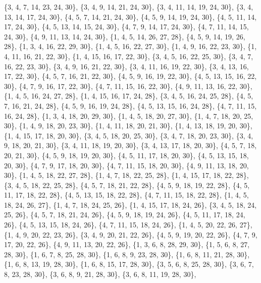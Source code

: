 \documentclass[11pt,a4paper]{article}
\begin{document}
{\{3, 4, 7, 14, 23, 24, 30\}, \{3, 4, 9, 14, 21, 24, 30\}, \{3, 4, 11, 14, 19, 24, 30\}, \{3, 4, 13, 14, 17, 24, 30\}, \{4, 5, 7, 14, 21, 24, 30\},
\{4, 5, 9, 14, 19, 24, 30\}, \{4, 5, 11, 14, 17, 24, 30\}, \{4, 5, 13, 14, 15, 24, 30\}, \{4, 7, 9, 14, 17, 24, 30\}, \{4, 7, 11, 14, 15, 24, 30\},
\{4, 9, 11, 13, 14, 24, 30\}, \{1, 4, 5, 14, 26, 27, 28\}, \{4, 5, 9, 14, 19, 26, 28\}, \{1, 3, 4, 16, 22, 29, 30\}, \{1, 4, 5, 16, 22, 27, 30\},
\{1, 4, 9, 16, 22, 23, 30\}, \{1, 4, 11, 16, 21, 22, 30\}, \{1, 4, 15, 16, 17, 22, 30\}, \{3, 4, 5, 16, 22, 25, 30\}, \{3, 4, 7, 16, 22, 23, 30\},
\{3, 4, 9, 16, 21, 22, 30\}, \{3, 4, 11, 16, 19, 22, 30\}, \{3, 4, 13, 16, 17, 22, 30\}, \{4, 5, 7, 16, 21, 22, 30\}, \{4, 5, 9, 16, 19, 22, 30\},
\{4, 5, 13, 15, 16, 22, 30\}, \{4, 7, 9, 16, 17, 22, 30\}, \{4, 7, 11, 15, 16, 22, 30\}, \{4, 9, 11, 13, 16, 22, 30\}, \{1, 4, 5, 16, 24, 27, 28\},
\{1, 4, 15, 16, 17, 24, 28\}, \{3, 4, 5, 16, 24, 25, 28\}, \{4, 5, 7, 16, 21, 24, 28\}, \{4, 5, 9, 16, 19, 24, 28\}, \{4, 5, 13, 15, 16, 24, 28\},
\{4, 7, 11, 15, 16, 24, 28\}, \{1, 3, 4, 18, 20, 29, 30\}, \{1, 4, 5, 18, 20, 27, 30\}, \{1, 4, 7, 18, 20, 25, 30\}, \{1, 4, 9, 18, 20, 23, 30\},
\{1, 4, 11, 18, 20, 21, 30\}, \{1, 4, 13, 18, 19, 20, 30\}, \{1, 4, 15, 17, 18, 20, 30\}, \{3, 4, 5, 18, 20, 25, 30\}, \{3, 4, 7, 18, 20, 23, 30\},
\{3, 4, 9, 18, 20, 21, 30\}, \{3, 4, 11, 18, 19, 20, 30\}, \{3, 4, 13, 17, 18, 20, 30\}, \{4, 5, 7, 18, 20, 21, 30\}, \{4, 5, 9, 18, 19, 20, 30\},
\{4, 5, 11, 17, 18, 20, 30\}, \{4, 5, 13, 15, 18, 20, 30\}, \{4, 7, 9, 17, 18, 20, 30\}, \{4, 7, 11, 15, 18, 20, 30\}, \{4, 9, 11, 13, 18, 20, 30\},
\{1, 4, 5, 18, 22, 27, 28\}, \{1, 4, 7, 18, 22, 25, 28\}, \{1, 4, 15, 17, 18, 22, 28\}, \{3, 4, 5, 18, 22, 25, 28\}, \{4, 5, 7, 18, 21, 22, 28\},
\{4, 5, 9, 18, 19, 22, 28\}, \{4, 5, 11, 17, 18, 22, 28\}, \{4, 5, 13, 15, 18, 22, 28\}, \{4, 7, 11, 15, 18, 22, 28\}, \{1, 4, 5, 18, 24, 26, 27\},
\{1, 4, 7, 18, 24, 25, 26\}, \{1, 4, 15, 17, 18, 24, 26\}, \{3, 4, 5, 18, 24, 25, 26\}, \{4, 5, 7, 18, 21, 24, 26\}, \{4, 5, 9, 18, 19, 24, 26\},
\{4, 5, 11, 17, 18, 24, 26\}, \{4, 5, 13, 15, 18, 24, 26\}, \{4, 7, 11, 15, 18, 24, 26\}, \{1, 4, 5, 20, 22, 26, 27\}, \{1, 4, 9, 20, 22, 23, 26\},
\{3, 4, 9, 20, 21, 22, 26\}, \{4, 5, 9, 19, 20, 22, 26\}, \{4, 7, 9, 17, 20, 22, 26\}, \{4, 9, 11, 13, 20, 22, 26\}, \{1, 3, 6, 8, 28, 29, 30\},
\{1, 5, 6, 8, 27, 28, 30\}, \{1, 6, 7, 8, 25, 28, 30\}, \{1, 6, 8, 9, 23, 28, 30\}, \{1, 6, 8, 11, 21, 28, 30\}, \{1, 6, 8, 13, 19, 28, 30\},
\{1, 6, 8, 15, 17, 28, 30\}, \{3, 5, 6, 8, 25, 28, 30\}, \{3, 6, 7, 8, 23, 28, 30\}, \{3, 6, 8, 9, 21, 28, 30\}, \{3, 6, 8, 11, 19, 28, 30\},
}
\end{document}
